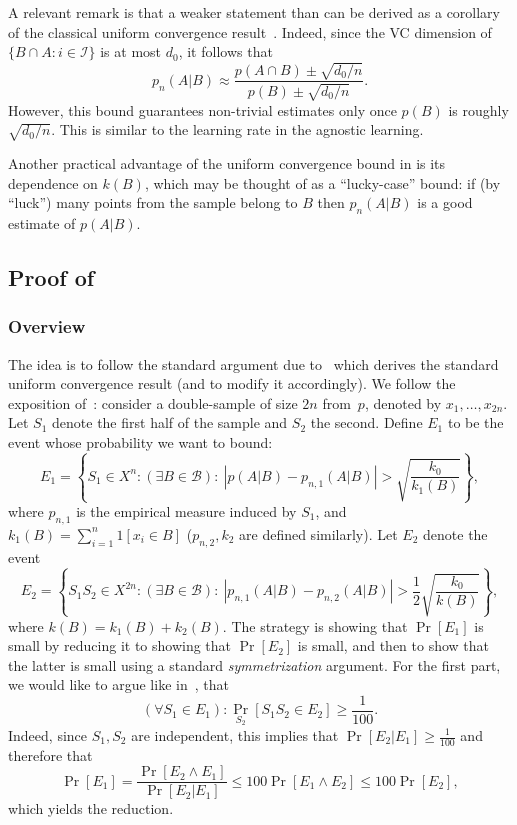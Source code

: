 \documentclass{article}
\def\B{{\mathcal B}}
\newcommand{\I}{\mathcal{I}}
\begin{document}
A relevant remark is that a weaker statement than 
can be derived as a corollary of the classical uniform convergence
result~\citep{V82}. 
Indeed, since the VC dimension of $\{B\cap A : i\in \I\}$ is at most $d_0$, it follows that 
\[p_n(A\vert B)\approx\frac{p(A\cap B) \pm \sqrt{d_0 / n}}{p(B)\pm \sqrt{d_0 / n}}.\]
However, this bound guarantees non-trivial estimates only once $p(B)$ is roughly $\sqrt{d_0  / n}$.
This is similar to the learning rate in the agnostic learning.

Another practical advantage of the uniform convergence bound in  is its dependence on $k(B)$,
which may be thought of as a ``lucky-case'' bound:
if (by ``luck'') many points from the sample belong to $B$ 
then $p_n(A\vert B)$ is a good estimate of $p(A\vert B)$.



\subsection{Proof of }

\subsubsection{Overview}
The idea is to follow the standard argument due to~\cite{vapnik} 
which derives the standard uniform convergence result (and to modify it accordingly). 
We follow the exposition of~\cite{anthony}:
consider a double-sample of size $2n$ from~$p$, denoted by $x_1,\ldots,x_{2n}$.
Let $S_1$ denote the first half of the sample and $S_2$ the second.
Define $E_1$ to be the event whose probability we want to bound:
\[E_1 = \left\{ S_1\in X^n : (\exists B\in \B):~ 
\left\lvert p(A \vert B) - p_{n,1}(A \vert B) \right\rvert > 
\sqrt{\frac{k_0}{k_{1}(B)}} \right\},\]
where $p_{n,1}$ is the empirical measure induced by $S_1$, 
and $k_{1}(B)=\sum_{i=1}^n 1[x_i\in B]$ ($p_{n,2}, k_{2}$ are defined similarly).
Let $E_2$ denote the event
\[E_2 = 
\left\{
S_1S_2\in X^{2n} : (\exists B\in\B):~
\left\lvert p_{n,1}(A \vert B)   -  p_{n,2}(A \vert B) \right\rvert >  
{\frac{1}{2}}\sqrt{\frac{k_0}{k(B)}}
\right\},
\]
where $k(B) = k_{1}(B)+k_{2}(B)$.
The strategy is showing that $\Pr[E_1]$ is small by reducing it to showing that $\Pr[E_2]$ 
is small, and then to show that the latter is small using a standard \emph{symmetrization} argument. 
For the first part, we would like to argue like in~\cite{anthony}, that
\begin{equation}\label{eq:anthony} 
(\forall S_1\in E_1): \Pr_{S_2}[S_1S_2\in E_2]\geq \frac{1}{100}.
\end{equation}
Indeed, since $S_1,S_2$ are independent, this implies that $\Pr[E_2 \vert E_1]\geq\frac{1}{100}$ 
	and therefore that 
	\[\Pr[E_1] = \frac{\Pr[E_2\land E_1]}{\Pr[E_2 \vert E_1]}\leq 100\Pr[E_1\land E_2] \leq 100\Pr[E_2],\] 
	which yields the reduction.
\end{document}
